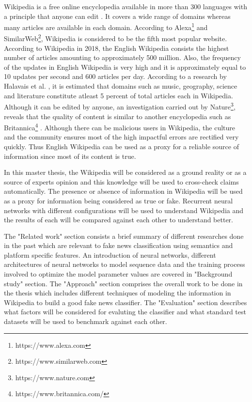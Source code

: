 \documentclass[a4paper, 11pt]{article}
\begin{document}
Wikipedia is a free online encyclopedia available in more than 300 languages with a principle that anyone can edit \cite{Wales2005}. It covers a wide range of domains whereas many articles are available in each domain. According to Alexa\footnote{https://www.alexa.com} and SimilarWeb\footnote{https://www.similarweb.com}, Wikipedia is considered to be the fifth most popular website. According to Wikipedia in 2018, the English Wikipedia consists the highest number of articles amounting to approximately 500 million. Also, the frequency of the updates in English Wikipedia is very high and it is approximately equal to 10 updates per second and 600 articles per day. According to a research by Halavais et al. \cite{Halavais2008}, it is estimated that domains such as music, geography, science and literature constitute atleast 5 percent of total articles each in Wikipedia. Although it can be edited by anyone, an investigation carried out by Nature\footnote{https://www.nature.com}, reveals that the quality of content is similar to another encyclopedia such as Britannica\footnote{https://www.britannica.com/} \cite{Wales2005}. Although there can be malicious users in Wikipedia, the culture and the community ensures most of the high impactful errors are rectified very quickly\cite{Priedhorsky2007}. Thus English Wikipedia can be used as a proxy for a reliable source of information since most of its content is true.
 
In this master thesis, the Wikipedia will be considered as a ground reality or as a source of experts opinion and this knowledge will be used to cross-check claims automatically. The presence or absence of information in Wikipedia will be used as a proxy for information being considered as true or fake. Recurrent neural networks with different configurations will be used to understand Wikipedia and the results of each will be compared against each other to understand better.

The "Related work" section consists a brief summary of different researches done in the past which are relevant to fake news classification using semantics and platform specific features. An introduction of neural networks, different architectures of neural networks to model sequence data and the training process involved to optimize the model parameter values are covered in "Background study" section. The "Approach" section comprises the overall work to be done in the thesis which includes different techniques of modeling the information in Wikipedia to build a good fake news classifier. The "Evaluation" section describes what factors will be considered for evaluting the classifier and what standard test datasets will be used to benchmark against each other.
\end{document}
